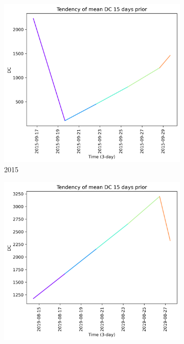 \begin{figure}[h]
    \centering
    \caption{DC values 15 days prior to wildfire}
    \begin{subfigure}{0.3\textwidth}
        \centering
        \includegraphics[width=\textwidth]{graphs/15days/2015_15daysprior_tendency_graph_DC.png}
        \caption{2015}
        \label{fig:dc_prior_15_days_2015}
    \end{subfigure}
    \hfill
    \begin{subfigure}{0.3\textwidth}
        \centering
        \includegraphics[width=\textwidth]{graphs/15days/2019_15daysprior_tendency_graph_DC.png}

\end{subfigure}
\end{figure}

